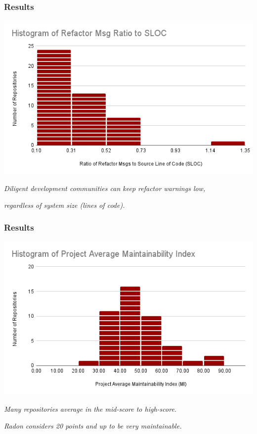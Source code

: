 \documentclass{beamer}
\begin{document}
\begin{frame}
  \frametitle{Results}
  \begin{center}
    \includegraphics[width=0.8\columnwidth]{Histogram of Refactor Msg Ratio to SLOC.png}
  \end{center}
  \begin{center}
    {\small \emph{Diligent development communities can keep refactor warnings low,}}
    
    {\small \emph{regardless of system size (lines of code).}}
  \end{center}
\end{frame}

\begin{frame}
  \frametitle{Results}
  \begin{center}
    \includegraphics[width=0.8\columnwidth]{Histogram of Project Average Maintainability Index_BucketSize_10.png}
  \end{center}
  \begin{center}
    {\small \emph{Many repositories average in the mid-score to high-score.}} 
    
    {\small \emph{Radon considers 20 points and up to be very maintainable.}}
  \end{center}
\end{frame}
\end{document}
